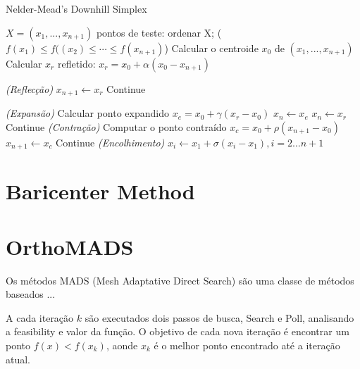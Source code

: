 \begin{algorithm}
    \caption{Nelder-Mead's Downhill Simplex}
    \label{alg:int_point_ocp}
    \begin{algorithmic}[1] %
        \Require $X = (x_1, ... , x_{n+1})$ pontos de teste:
                \State ordenar X; ($f(x _1) \leq f(({x} _2) \leq \cdots \leq f(x_{n+1})$) 
                \State Calcular o centroide $x_0$ de $(x_{1}, ... , x_{n+1})$
                \State Calcular $x_r$ refletido: $x_r = x_0 + \alpha(x_0 - x_{n+1})$ 
                
\BState \emph{(Reflecção)}                
                    \State $x_{n+1} \gets x_r$
                    \State Continue
                \EndIf

\BState \emph{(Expansão)}
                    \State Calcular ponto expandido $x_e = x_0 + \gamma(x_r - x_0) $
                        \State $x_n \gets x_e$
                    \Else
                        \State $x_n \gets x_r$                  
                    \EndIf
                    \State Continue
                \EndIf
\BState \emph{(Contração)}
                \State Computar o ponto contraído $x_c = x_0 + \rho(x_{n+1} - x_0)$
                    \State $x_{n+1} \gets x_c$
                    \State Continue             
                \EndIf
\BState \emph{(Encolhimento)}
                \State $x_i \gets x_1 + \sigma(x_i - x_1), i=2 \dots n+1$
            \EndWhile
    \end{algorithmic}
\end{algorithm}



%
\section{Baricenter Method}


\section{OrthoMADS}

Os métodos MADS (Mesh Adaptative Direct Search) são uma classe de métodos baseados ...


A cada iteração $ k $ são executados dois passos de busca, Search e Poll, analisando a feasibility e valor da função. O objetivo de cada nova iteração é encontrar um ponto $f(x) < f(x_k)$, aonde $x_k$ é o melhor ponto encontrado até a iteração atual. 

